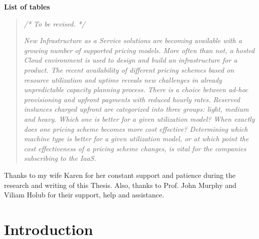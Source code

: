 \documentclass[]{final_report}
\begin{document}
\maketitle
\tableofcontents{}\newpage
\listoffigures\newpage
\par{\textbf{List of tables}}


\begin{abstract}

\emph{ /* To be revised. */} \par
\textsl{New Infrastructure as a Service solutions are becoming available with a growing number of supported pricing models. More often than not, a hosted Cloud environment is used to design and build an infrastructure for a product. The recent availability of different pricing schemes based on resource utilization and uptime reveals new challenges in already unpredictable capacity planning process. There is a choice between ad-hoc provisioning and upfront payments with reduced hourly rates. Reserved instances charged upfront are categorized into three groups: light, medium and heavy. Which one is better for a given utilization model? When exactly does one pricing scheme becomes more cost effective? Determining which machine type is better for a given utilization model, or at which point the cost effectiveness of a pricing scheme changes, is vital for the companies subscribing to the IaaS. }

\end{abstract}
\newpage


Thanks to my wife Karen for her constant support and patience during the research and writing
of this Thesis.
Also, thanks to Prof. John Murphy and Viliam Holub for their support, help and assistance.


\chapter{Introduction}
\end{document}

